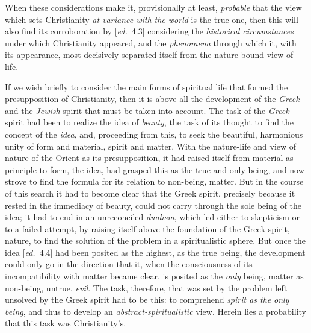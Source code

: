 \documentclass[12pt,a4paper,openany]{book}
\newcommand{\kpage}[1]{\marginnote{\footnotesize\textit{[#1]}}}
\newcommand{\ed}[1]{{\small[\textit{ed.}\ #1]}}
\begin{document}
When these considerations make it, provisionally at least, \emph{probable}
that the view which sets Christianity \emph{at variance with the world}
is the true one, then this will also find its corroboration by \ed{4.3}
considering the \emph{historical circumstances} under which Christianity appeared,
and the \emph{phenomena} through which it, with its appearance,
most decisively separated itself from the nature-bound view of life.

If we wish briefly to consider the main forms of spiritual life
that formed the presupposition of Christianity, then it is
above all the development of the \emph{Greek} and the \emph{Jewish} spirit that must
be taken into account. The task of the \emph{Greek} spirit had been to realize
the idea of \emph{beauty}, the task of its thought to find the concept of the \emph{idea}, and,
proceeding from this, to seek the beautiful, harmonious unity of form and
material, spirit and matter. With the nature-life and view of nature of the Orient
as its presupposition, it had raised itself from material as principle to
form, the idea, had grasped this as the true and only being, and
\kpage{88}now strove to find the formula for its relation to non-being,
matter. But in the course of this search it had to become clear that the
Greek spirit, precisely because it rested in the immediacy of beauty,
could not carry through the sole being of the idea; it had to end in
an unreconciled \emph{dualism}, which led either to skepticism or to a failed
attempt, by raising itself above the foundation of the Greek spirit,
nature, to find the solution of the problem in a spiritualistic sphere.
But once the idea \ed{4.4} had been posited as the highest, as
the true being, the development could only go in the direction
that it, when the consciousness of its incompatibility with matter became
clear, is posited as the \emph{only} being, matter as non-being,
untrue, \emph{evil}. The task, therefore, that was set by the problem left unsolved
by the Greek spirit had to be this: to comprehend \emph{spirit as the}
\emph{only being}, and thus to develop an \emph{abstract-spiritualistic} view.
Herein lies a probability that this task was Christianity's.
\end{document}
